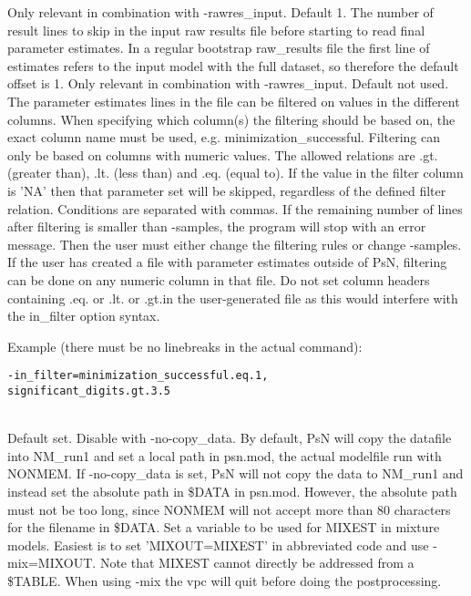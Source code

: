 \begin{optionlist}
\nextopt
{}
Only relevant in combination with -rawres\_input. Default 1. The number of result lines to skip in the input raw results file before starting to read final parameter estimates. In a regular bootstrap raw\_results file the first line of estimates refers to the input model with the full dataset, so therefore the default offset is 1. 
\nextopt
{}
Only relevant in combination with -rawres\_input. Default not used. 
The parameter estimates lines in the file can be filtered on values in the different columns. When specifying which column(s) the 
filtering should be based on, the exact column name must be used, e.g. minimization\_successful. Filtering can only be based on columns 
with numeric values. The allowed relations are .gt. (greater than), .lt. (less than) and .eq. (equal to). If the value in the filter 
column is 'NA' then that parameter set will be skipped, regardless of the defined filter relation. Conditions are separated with commas. 
If the remaining number of lines after filtering is smaller than -samples, the program will stop with an error message. 
Then the user must either change the filtering rules or change -samples. If the user has created a file with parameter estimates outside 
of PsN, filtering can be done on any numeric column in that file. Do not set column headers containing .eq. or .lt. or .gt.in the 
user-generated file as this would interfere with the in\_filter option syntax.

Example (there must be no linebreaks in the actual command):
\begin{verbatim}
-in_filter=minimization_successful.eq.1,
significant_digits.gt.3.5
\end{verbatim} \\
\nextopt
{}
Default set. Disable with -no-copy\_data. By default, PsN will copy the datafile into NM\_run1 and set a local path in psn.mod, the actual modelfile run with NONMEM. If -no-copy\_data is set, PsN will not copy the data to NM\_run1 and instead set the absolute path in \$DATA in psn.mod. However, 
the absolute path must not be too long, since NONMEM will not accept more than 80 characters for the filename in \$DATA.  
\nextopt
{}
      Set a variable to be used for MIXEST in mixture models.
      Easiest is to set 'MIXOUT=MIXEST' in abbreviated code
      and use -mix=MIXOUT. Note that MIXEST cannot directly
      be addressed from a \$TABLE. When using -mix the vpc
      will quit before doing the postprocessing.

\end{optionlist}




